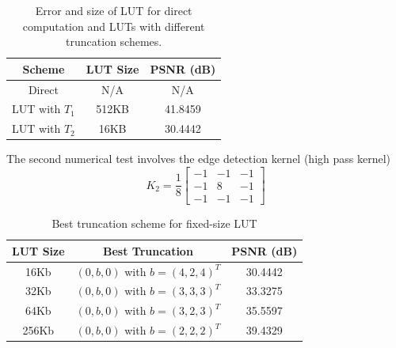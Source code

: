 \documentclass[12pt]{amsart}
\theoremstyle{definition}
\theoremstyle{remark}
\numberwithin{thm}{section}
\begin{document}
\begin{center}
\begin{table}
	 
    \begin{tabular}{ | c | c| c |}
    \hline
    Scheme & LUT Size & PSNR (dB) \\ \hline
    Direct & N/A & N/A  \\ \hline
    LUT with $T_1$ & 512KB & 41.8459 \\ \hline
    LUT with $T_2$ & 16KB & 30.4442 \\ \hline   
    \end{tabular}
    \bigskip
    
    \caption{Error and size of LUT for direct computation and LUTs with different truncation schemes.}
    \label{tbl:low_pass}
\end{table} 
\end{center}



The second numerical test involves the edge detection kernel (high pass kernel)
$$
K_2=\frac{1}{8}
\begin{bmatrix}
-1 & -1 & -1\\
-1 &  8 & -1\\
-1 & -1 & -1
\end{bmatrix}
$$
\begin{center}
\begin{table}
	
    \begin{tabular}{ | c | c | c | }
    \hline
    LUT Size & Best Truncation & PSNR (dB) \\ \hline
    16Kb& $(0,b,0)$ with $b=(4,2,4)^T$ & 30.4442 \\ \hline
    32Kb& $(0,b,0)$ with $b=(3,3,3)^T$ & 33.3275 \\ \hline 
    64Kb& $(0,b,0)$ with $b=(3,2,3)^T$ & 35.5597 \\ \hline 
    256Kb& $(0,b,0)$ with $b=(2,2,2)^T$ & 39.4329 \\ \hline 
    \end{tabular}
    \bigskip
    
    \caption{Best truncation scheme for fixed-size LUT}
    \label{tbl:optimization}
\end{table} 
\end{center}
\end{document}

